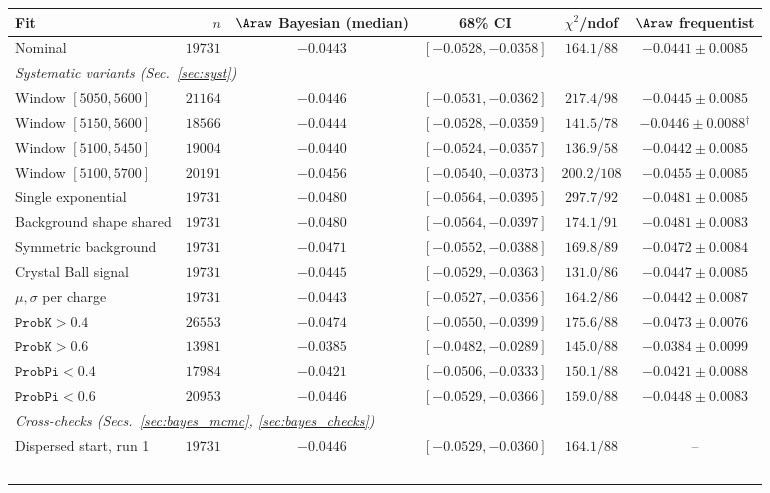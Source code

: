 \begin{figure}[!t]
\makeatletter{}\makeatother
\centering
\begin{tabular}{lrccc|c}
\toprule
Fit & $n$ & $\Araw$ Bayesian (median) & 68\% CI & $\chi^2$/ndof & $\Araw$ frequentist \\
\midrule
Nominal & $19731$ & $-0.0443$ & $[-0.0528,-0.0358]$ & $164.1/88$ & $-0.0441\pm0.0085$ \\
\multicolumn{6}{l}{\emph{Systematic variants (Sec.~\ref{sec:syst})}} \\
Window $[5050,5600]$ & $21164$ & $-0.0446$ & $[-0.0531,-0.0362]$ & $217.4/98$ & $-0.0445\pm0.0085$ \\
Window $[5150,5600]$ & $18566$ & $-0.0444$ & $[-0.0528,-0.0359]$ & $141.5/78$ & $-0.0446\pm0.0088$$^\dagger$ \\
Window $[5100,5450]$ & $19004$ & $-0.0440$ & $[-0.0524,-0.0357]$ & $136.9/58$ & $-0.0442\pm0.0085$ \\
Window $[5100,5700]$ & $20191$ & $-0.0456$ & $[-0.0540,-0.0373]$ & $200.2/108$ & $-0.0455\pm0.0085$ \\
Single exponential & $19731$ & $-0.0480$ & $[-0.0564,-0.0395]$ & $297.7/92$ & $-0.0481\pm0.0085$ \\
Background shape shared & $19731$ & $-0.0480$ & $[-0.0564,-0.0397]$ & $174.1/91$ & $-0.0481\pm0.0083$ \\
Symmetric background & $19731$ & $-0.0471$ & $[-0.0552,-0.0388]$ & $169.8/89$ & $-0.0472\pm0.0084$ \\
Crystal Ball signal & $19731$ & $-0.0445$ & $[-0.0529,-0.0363]$ & $131.0/86$ & $-0.0447\pm0.0085$ \\
$\mu,\sigma$ per charge & $19731$ & $-0.0443$ & $[-0.0527,-0.0356]$ & $164.2/86$ & $-0.0442\pm0.0087$ \\
$\texttt{ProbK}>0.4$ & $26553$ & $-0.0474$ & $[-0.0550,-0.0399]$ & $175.6/88$ & $-0.0473\pm0.0076$ \\
$\texttt{ProbK}>0.6$ & $13981$ & $-0.0385$ & $[-0.0482,-0.0289]$ & $145.0/88$ & $-0.0384\pm0.0099$ \\
$\texttt{ProbPi}<0.4$ & $17984$ & $-0.0421$ & $[-0.0506,-0.0333]$ & $150.1/88$ & $-0.0421\pm0.0088$ \\
$\texttt{ProbPi}<0.6$ & $20953$ & $-0.0446$ & $[-0.0529,-0.0366]$ & $159.0/88$ & $-0.0448\pm0.0083$ \\
\multicolumn{6}{l}{\emph{Cross-checks (Secs.~\ref{sec:bayes_mcmc}, \ref{sec:bayes_checks})}} \\
Dispersed start, run 1 & $19731$ & $-0.0446$ & $[-0.0529,-0.0360]$ & $164.1/88$ & -- \\
$$
\end{tabular}
\end{figure}
